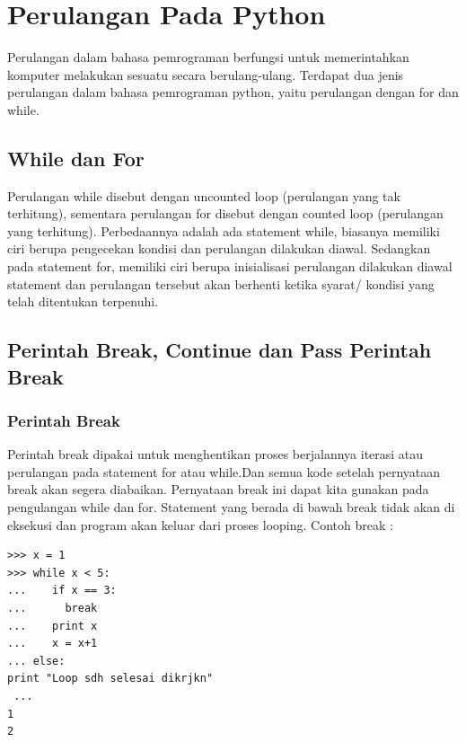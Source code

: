 

\section{Perulangan Pada Python}
Perulangan dalam bahasa pemrograman berfungsi untuk memerintahkan komputer melakukan sesuatu secara berulang-ulang. Terdapat dua jenis perulangan dalam bahasa pemrograman python, yaitu perulangan dengan for dan while.
\subsection{While dan For}
Perulangan while disebut dengan uncounted loop (perulangan yang tak terhitung), sementara perulangan for disebut dengan counted loop (perulangan yang terhitung). Perbedaannya adalah ada statement while, biasanya memiliki ciri berupa pengecekan kondisi dan perulangan dilakukan diawal. Sedangkan pada statement for, memiliki ciri berupa inisialisasi perulangan dilakukan diawal statement dan perulangan tersebut akan berhenti ketika syarat/ kondisi yang telah ditentukan terpenuhi\cite{santoso2009bahasa}.

\subsection{Perintah Break, Continue dan Pass Perintah Break}
\subsubsection{Perintah Break}
Perintah break dipakai untuk menghentikan proses berjalannya iterasi atau perulangan pada statement for atau while\cite{arfian2012rekayasa}.Dan semua kode setelah pernyataan break akan segera diabaikan. Pernyataan break ini dapat kita gunakan pada pengulangan while dan for.
Statement yang berada di bawah break tidak akan di eksekusi dan program akan keluar dari proses looping.  
Contoh break : 
\begin{verbatim}
>>> x = 1     
>>> while x < 5:     
...    if x == 3:     
...      break     
...    print x     
...    x = x+1                                                                                                                    
... else:          
print "Loop sdh selesai dikrjkn"   
 ...     
1    
2 
\end{verbatim}

